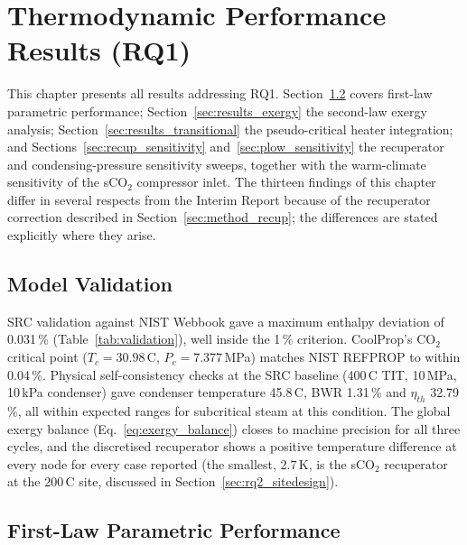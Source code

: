 \chapter{Thermodynamic Performance Results (RQ1)}
\label{ch:results_rq1}

This chapter presents all results addressing RQ1. Section~\ref{sec:results_firstlaw}
covers first-law parametric performance; Section~\ref{sec:results_exergy} the
second-law exergy analysis; Section~\ref{sec:results_transitional} the
pseudo-critical heater integration; and Sections~\ref{sec:recup_sensitivity}
and~\ref{sec:plow_sensitivity} the recuperator and condensing-pressure
sensitivity sweeps, together with the warm-climate sensitivity of the sCO$_2$
compressor inlet. The thirteen findings of this chapter differ in several
respects from the Interim Report because of the recuperator correction
described in Section~\ref{sec:method_recup}; the differences are stated
explicitly where they arise.

\section{Model Validation}
\label{sec:results_validation}

SRC validation against NIST Webbook gave a maximum enthalpy deviation of
0.031\,\% (Table~\ref{tab:validation}), well inside the 1\,\% criterion.
CoolProp's CO$_2$ critical point ($T_c = 30.98$\,\textdegree C, $P_c =
7.377$\,MPa) matches NIST REFPROP to within 0.04\,\%. Physical
self-consistency checks at the SRC baseline (400\,\textdegree C TIT,
10\,MPa, 10\,kPa condenser) gave condenser temperature 45.8\,\textdegree C,
BWR 1.31\,\% and $\eta_{th}$ 32.79\,\%, all within expected ranges for
subcritical steam at this condition. The global exergy balance
(Eq.~\ref{eq:exergy_balance}) closes to machine precision for all three
cycles, and the discretised recuperator shows a positive temperature
difference at every node for every case reported (the smallest, 2.7\,K, is
the sCO$_2$ recuperator at the 200\,\textdegree C site, discussed in
Section~\ref{sec:rq2_sitedesign}).

\section{First-Law Parametric Performance}
\label{sec:results_firstlaw}

